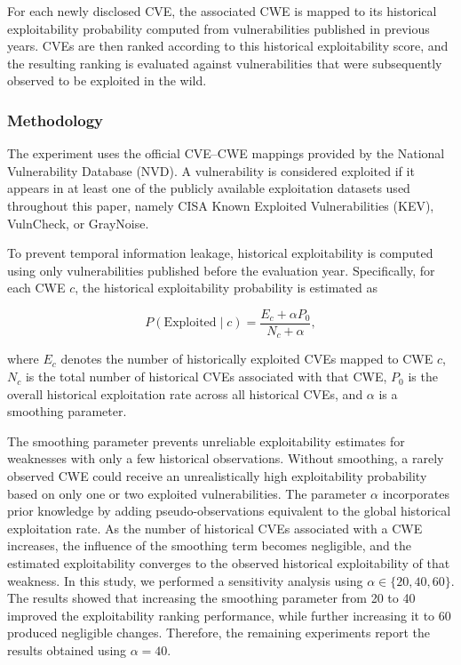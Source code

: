 \documentclass[conference,compsoc]{IEEEtran}
\begin{document}
For each newly disclosed CVE, the associated CWE is mapped to its historical exploitability probability computed from vulnerabilities published in previous years. CVEs are then ranked according to this historical exploitability score, and the resulting ranking is evaluated against vulnerabilities that were subsequently observed to be exploited in the wild.

\subsubsection{Methodology}

The experiment uses the official CVE--CWE mappings provided by the National Vulnerability Database (NVD). A vulnerability is considered exploited if it appears in at least one of the publicly available exploitation datasets used throughout this paper, namely CISA Known Exploited Vulnerabilities (KEV), VulnCheck, or GrayNoise.

To prevent temporal information leakage, historical exploitability is computed using only vulnerabilities published before the evaluation year. Specifically, for each CWE $c$, the historical exploitability probability is estimated as

\begin{equation}
P(\mathrm{Exploited}\mid c)=
\frac{E_c+\alpha P_0}
{N_c+\alpha},
\label{eq:historical_exploitability}
\end{equation}

where $E_c$ denotes the number of historically exploited CVEs mapped to CWE $c$, $N_c$ is the total number of historical CVEs associated with that CWE, $P_0$ is the overall historical exploitation rate across all historical CVEs, and $\alpha$ is a smoothing parameter.


The smoothing parameter prevents unreliable exploitability estimates for weaknesses with only a few historical observations. Without smoothing, a rarely observed CWE could receive an unrealistically high exploitability probability based on only one or two exploited vulnerabilities. The parameter $\alpha$ incorporates prior knowledge by adding pseudo-observations equivalent to the global historical exploitation rate. As the number of historical CVEs associated with a CWE increases, the influence of the smoothing term becomes negligible, and the estimated exploitability converges to the observed historical exploitability of that weakness. In this study, we performed a sensitivity analysis using $\alpha \in \{20,40,60\}$. The results showed that increasing the smoothing parameter from 20 to 40 improved the exploitability ranking performance, while further increasing it to 60 produced negligible changes. Therefore, the remaining experiments report the results obtained using $\alpha=40$.
\end{document}
